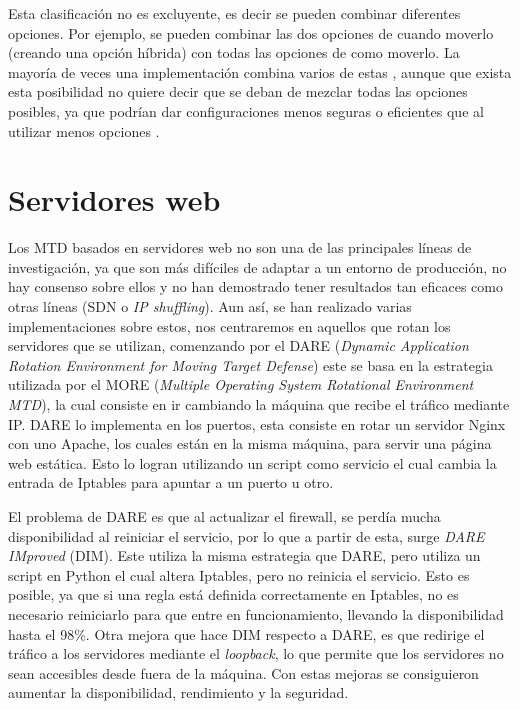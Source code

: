 Esta clasificación no es excluyente, es decir se pueden combinar diferentes opciones. Por ejemplo, se pueden combinar las dos opciones de cuando moverlo (creando una opción híbrida) con todas las opciones de como moverlo. La mayoría de veces una implementación combina varios de estas \cite{MTD-MORE+DARE+Java}\cite{MTD-DARE}\cite{MTD-arab}, aunque que exista esta posibilidad no quiere decir que se deban de mezclar todas las opciones posibles, ya que podrían dar configuraciones menos seguras o eficientes que al utilizar menos opciones \cite{MTD-comparativa-gorda}.

\section{Servidores web}
Los MTD basados en servidores web no son una de las principales líneas de investigación, ya que son más difíciles de adaptar a un entorno de producción, no hay consenso sobre ellos y no han demostrado tener resultados tan eficaces como otras líneas (SDN o \textit{IP shuffling}). Aun así, se han realizado varias implementaciones sobre estos, nos centraremos en aquellos que rotan los servidores que se utilizan, comenzando por el DARE (\textit{Dynamic Application Rotation Environment for Moving Target Defense}) este se basa en la estrategia utilizada por el MORE (\textit{Multiple Operating System Rotational Environment MTD})\cite{MORE}, la cual consiste en ir cambiando la máquina que recibe el tráfico mediante IP. DARE lo implementa en los puertos, esta consiste en rotar un servidor Nginx\cite{nginx} con uno Apache\cite{apache}, los cuales están en la misma máquina, para servir una página web estática. Esto lo logran utilizando un script como servicio el cual cambia la entrada de Iptables\cite{iptables} para apuntar a un puerto u otro.

El problema de DARE es que al actualizar el firewall, se perdía mucha disponibilidad al reiniciar el servicio, por lo que a partir de esta, surge \textit{DARE IMproved} (DIM). Este utiliza la misma estrategia que DARE, pero utiliza un script en Python el cual altera Iptables, pero no reinicia el servicio. Esto es posible, ya que si una regla está definida correctamente en Iptables, no es necesario reiniciarlo para que entre en funcionamiento, llevando la disponibilidad hasta el 98\%. Otra mejora que hace DIM respecto a DARE, es que redirige el tráfico a los servidores mediante el \textit{loopback}, lo que permite que los servidores no sean accesibles desde fuera de la máquina. Con estas mejoras se consiguieron aumentar la disponibilidad, rendimiento y la seguridad.

